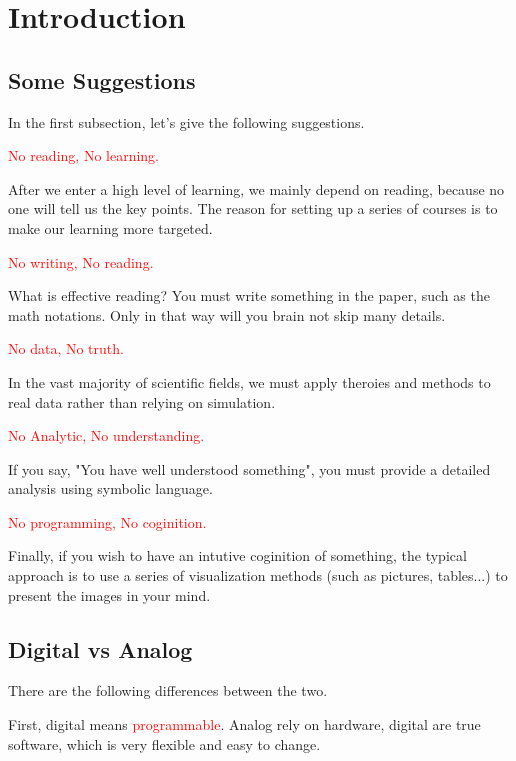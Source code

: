 \section{Introduction}
    \subsection{Some Suggestions}
        In the first subsection, let's give the following suggestions.

        \noindent \textcolor{red}{No reading, No learning.}

        After we enter a high level of learning, we mainly depend on reading,
        because no one will tell us the key points. 
        The reason for setting up a series of courses is to make our learning more targeted.

        \noindent \textcolor{red}{No writing, No reading.}

        What is effective reading? You must write something in the paper, such as the math notations.
        Only in that way will you brain not skip many details.
        
        \noindent \textcolor{red}{No data, No truth.}

        In the vast majority of scientific fields, 
        we must apply theroies and methods to real data rather than relying on simulation.
        
        \noindent \textcolor{red}{No Analytic, No understanding.}

        If you say, "You have well understood something", you must provide a detailed analysis
        {using symbolic language}.
        
        \noindent \textcolor{red}{No programming, No coginition.}

        Finally, if you wish to have an intutive coginition of something, 
        the typical approach is to use a series of visualization methods (such as pictures, tables...) to present the images in your mind.

    \subsection{Digital vs Analog}
        There are the following differences between the two.

        First, digital means \textcolor{red}{programmable}. 
        Analog rely on hardware, digital are true software, which is very flexible and easy to change.

